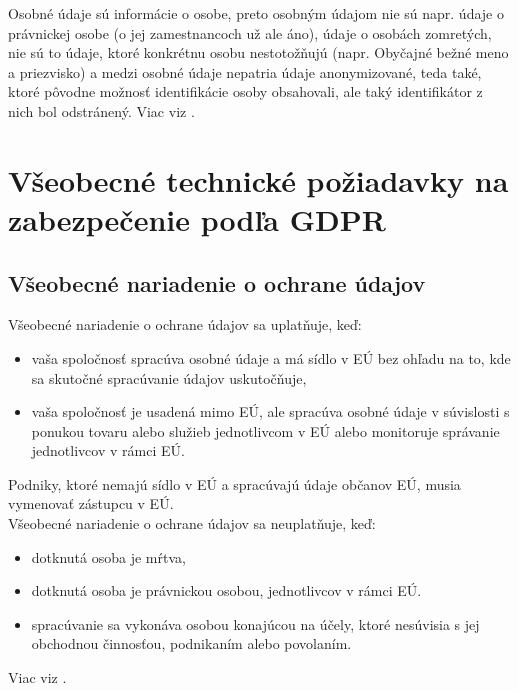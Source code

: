 Osobné údaje sú informácie o osobe, preto osobným údajom nie sú napr. údaje o právnickej osobe (o jej zamestnancoch už ale áno), údaje o osobách zomretých, nie sú to údaje, ktoré konkrétnu osobu nestotožňujú (napr. Obyčajné bežné meno a priezvisko) a medzi osobné údaje nepatria údaje anonymizované, teda také, ktoré pôvodne možnosť identifikácie osoby obsahovali, ale taký identifikátor z nich bol odstránený. Viac viz \cite{wikiGDPR}.

\chapter{Všeobecné technické požiadavky na zabezpečenie podľa GDPR}
\section{Všeobecné nariadenie o ochrane údajov}
Všeobecné nariadenie o ochrane údajov sa uplatňuje, keď:
\begin{itemize}
\item vaša spoločnosť spracúva osobné údaje a má sídlo v EÚ bez ohľadu na to, kde sa skutočné spracúvanie údajov uskutočňuje,
\item vaša spoločnosť je usadená mimo EÚ, ale spracúva osobné údaje v súvislosti s ponukou tovaru alebo služieb jednotlivcom v EÚ alebo monitoruje správanie jednotlivcov v rámci EÚ.
\end{itemize}
Podniky, ktoré nemajú sídlo v EÚ a spracúvajú údaje občanov EÚ, musia vymenovať zástupcu v EÚ.\\

Všeobecné nariadenie o ochrane údajov sa neuplatňuje, keď:
\begin{itemize}
\item dotknutá osoba je mŕtva,
\item dotknutá osoba je právnickou osobou, jednotlivcov v rámci EÚ.
\item spracúvanie sa vykonáva osobou konajúcou na účely, ktoré nesúvisia s jej obchodnou činnosťou, podnikaním alebo povolaním.
\end{itemize}
Viac viz \cite{strankaP}.
